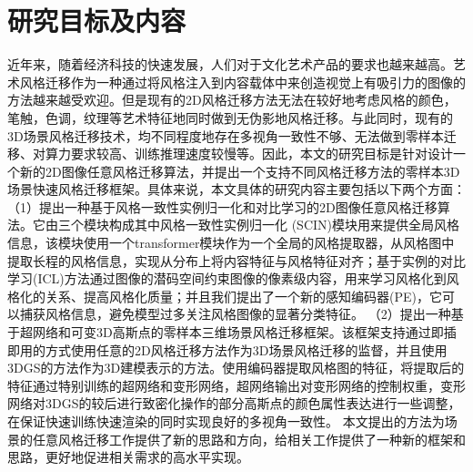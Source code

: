 

\section{研究目标及内容}
近年来，随着经济科技的快速发展，人们对于文化艺术产品的要求也越来越高。艺术风格迁移作为一种通过将风格注入到内容载体中来创造视觉上有吸引力的图像的方法越来越受欢迎。但是现有的2D风格迁移方法无法在较好地考虑风格的颜色，笔触，色调，纹理等艺术特征地同时做到无伪影地风格迁移。与此同时，现有的3D场景风格迁移技术，均不同程度地存在多视角一致性不够、无法做到零样本迁移、对算力要求较高、训练推理速度较慢等。因此，本文的研究目标是针对设计一个新的2D图像任意风格迁移算法，并提出一个支持不同风格迁移方法的零样本3D场景快速风格迁移框架。具体来说，本文具体的研究内容主要包括以下两个方面：
\newline \indent
（1）提出一种基于风格一致性实例归一化和对比学习的2D图像任意风格迁移算法。它由三个模块构成其中风格一致性实例归一化 (SCIN)模块用来提供全局风格信息，该模块使用一个transformer模块作为一个全局的风格提取器，从风格图中提取长程的风格信息，实现从分布上将内容特征与风格特征对齐；基于实例的对比学习(ICL)方法通过图像的潜码空间约束图像的像素级内容，用来学习风格化到风格化的关系、提高风格化质量；并且我们提出了一个新的感知编码器(PE)，它可以捕获风格信息，避免模型过多关注风格图像的显著分类特征。   
\newline \indent
（2）提出一种基于超网络和可变3D高斯点的零样本三维场景风格迁移框架。该框架支持通过即插即用的方式使用任意的2D风格迁移方法作为3D场景风格迁移的监督，并且使用3DGS的方法作为3D建模表示的方法。使用编码器提取风格图的特征，将提取后的特征通过特别训练的超网络和变形网络，超网络输出对变形网络的控制权重，变形网络对3DGS的较后进行致密化操作的部分高斯点的颜色属性表达进行一些调整，在保证快速训练快速渲染的同时实现良好的多视角一致性。
\newline \indent	
本文提出的方法为场景的任意风格迁移工作提供了新的思路和方向，给相关工作提供了一种新的框架和思路，更好地促进相关需求的高水平实现。

